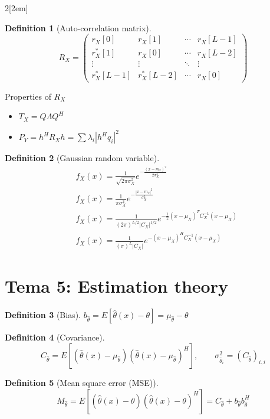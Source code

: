 \documentclass[leqno]{article}
\newtheorem*{definition}{Definition}
\begin{document}
\begin{multicols}{2}[\columnsep2em]
\begin{definition}[Auto-correlation matrix]
\[
  R_X=  \begin{pmatrix} r_X[0] & r_X[1] & \cdots & r_X[L-1] \\
	r^*_X[1] & r_X[0] & \cdots & r_X[L-2] \\
	\vdots & \vdots & \ddots & \vdots \\
	r^*_X[L-1] & r_X^*[L-2] & \cdots & r_X[0]
\end{pmatrix} 
\] 
\end{definition}

Properties of $R_X$
 \begin{itemize}[topsep=-6pt, itemsep=0pt]
  \item $T_X = Q\Lambda Q^H$
  \item  $P_Y=h^HR_Xh = \sum \lambda_i|h^Hq_i|^2$
\end{itemize}

\begin{definition}[Gaussian random variable]
\begin{align*}
  &f_X(x)=\frac{1}{\sqrt{2\pi\sigma _X^2}} e^{-\frac{(x-m_x)^2}{2\sigma ^2_{X}}}\\
  &f_X(x)=\frac{1}{\pi\sigma _X^2} e^{-\frac{|x-m_x|^2}{\sigma ^2_{X}}} \\
  &f_X(x)=\frac{1}{(2\pi)^{L /2}|C_X|^{1 /2}} e^{-\frac{1}{2}(x-\mu_X)^TC_X^{-1}(x-\mu_X)}\\
  &f_X(x)=\frac{1}{(\pi)^{L}|C_X|} e^{-(x-\mu_X)^HC_X^{-1}(x-\mu_X)}
\end{align*}
\end{definition}

\section{Tema 5: Estimation theory}

\begin{definition}[Bias] $b_{\hat{\theta}} = E[\hat{\theta} (x)-\theta ] = \mu_{\hat{\theta }} -\theta $
\end{definition}

\begin{definition}[Covariance] 
  \[
    C_{\hat{\theta }} = E[(\hat{\theta }(x)-\mu_{\hat{\theta }})(\hat{\theta }(x)-\mu_{\hat{\theta }})^H], \qquad \sigma_{\hat{\theta}_i}^2 = (C_{\hat{\theta }})_{i,i}
  \] 
\end{definition}

\begin{definition}[Mean square error (MSE)]
  \[
    M_{\hat{\theta }} = E[(\hat{\theta }(x)-\theta )(\hat{\theta }(x)-\theta )^H] = C_{\hat{\theta }} + b_{\hat{\theta }}b_{\hat{\theta }}^H
  \] 
\end{definition}


\end{multicols}
\end{document}
